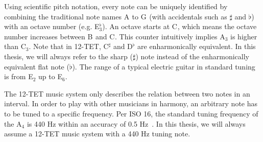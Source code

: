\documentclass[a4paper,10pt,twocolumn]{article}
\newcommand{\note}[2]{#1${}_{#2}$}
\newcommand{\notesharp}[2]{#1${}_{#2}^{\sharp}$}
\newcommand{\noteflat}[2]{#1${}_{#2}^{\flat}$}
\begin{document}
Using scientific pitch notation, every note can be uniquely identified by combining the traditional note names \note{A}{} to \note{G}{} (with accidentals such as $\sharp$ and $\flat$) with an octave number (e.g. \noteflat{E}{3}). An octave starts at \note{C}{}, which means the octave number increases between \note{B}{} and \note{C}{}. This counter intuitively implies \note{A}{3} is higher than \note{C}{3}. Note that in 12-TET, \notesharp{C}{} and \noteflat{D}{} are enharmonically equivalent. In this thesis, we will always refer to the sharp ($\sharp$) note instead of the enharmonically equivalent flat note ($\flat$). %
The range of a typical electric guitar in standard tuning is from \note{E}{2} up to \note{E}{6}.

The 12-TET music system only describes the relation between two notes in an interval. In order to play with other musicians in harmony, an arbitrary note has to be tuned to a specific frequency. Per ISO 16, the standard tuning frequency of the \note{A}{4} is 440 Hz within an accuracy of 0.5 Hz~\cite{isoa}. In this thesis, we will always assume a 12-TET music system with a 440 Hz tuning note.
\end{document}
